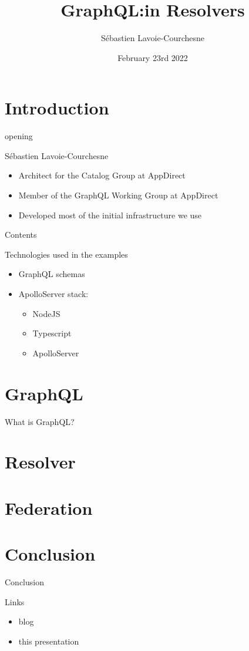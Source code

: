 \documentclass{beamer}
\title{GraphQL:\@Thinking in Resolvers}
\author{Sébastien Lavoie-Courchesne}
\date{February 23rd 2022}
\begin{document}
\begin{frame}
  \titlepage{}
\end{frame}

\section{Introduction}
\begin{frame}
  opening
\end{frame}

\begin{frame}{Sébastien Lavoie-Courchesne}
  \begin{itemize}
  \item Architect for the Catalog Group at AppDirect
  \item Member of the GraphQL Working Group at AppDirect
  \item Developed most of the initial infrastructure we use
  \end{itemize}
\end{frame}

\begin{frame}{Contents}
\end{frame}

\begin{frame}{Technologies used in the examples}
  \begin{itemize}
  \item GraphQL schemas
  \item ApolloServer stack:
    \begin{itemize}
    \item NodeJS
    \item Typescript
    \item ApolloServer
    \end{itemize}
  \end{itemize}
\end{frame}

\section{GraphQL}
\begin{frame}{What is GraphQL?}
  
\end{frame}

\section{Resolver}
\section{Federation}
\section{Conclusion}
\begin{frame}{Conclusion}
\end{frame}

\begin{frame}{Links}
  \begin{itemize}
  \item blog
  \item this presentation
  \end{itemize}
\end{frame}
\end{document}

